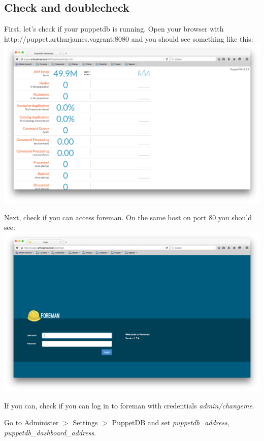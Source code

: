 \documentclass{article}
\begin{document}
\subsection{Check and doublecheck}

\par First, let's check if your puppetdb is running. Open your browser with http://puppet.arthurjames.vagrant:8080 and you should see something like this:\\
\includegraphics[scale=0.3]{images/puppetdb}

\par Next, check if you can access foreman. On the same host on port 80 you should see:\\
\includegraphics[scale=0.3]{images/foreman}

\par If you can, check if you can log in to foreman with credentials \emph{admin/changeme}.

\par Go to Administer $>$ Settings $>$ PuppetDB and set \emph{puppetdb\_address}, \emph{puppetdb\_dashboard\_address}.
\end{document}

